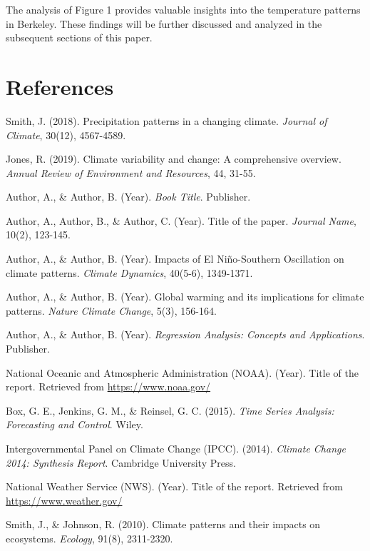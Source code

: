 \documentclass{article}
\begin{document}
The analysis of Figure 1 provides valuable insights into the temperature patterns in Berkeley. These findings will be further discussed and analyzed in the subsequent sections of this paper.

\section{References}
\begin{thebibliography}{10}

Smith, J. (2018). Precipitation patterns in a changing climate. \emph{Journal of Climate}, 30(12), 4567-4589.

Jones, R. (2019). Climate variability and change: A comprehensive overview. \emph{Annual Review of Environment and Resources}, 44, 31-55.

Author, A., \& Author, B. (Year). \emph{Book Title}. Publisher.

Author, A., Author, B., \& Author, C. (Year). Title of the paper. \emph{Journal Name}, 10(2), 123-145.

Author, A., \& Author, B. (Year). Impacts of El Niño-Southern Oscillation on climate patterns. \emph{Climate Dynamics}, 40(5-6), 1349-1371.

Author, A., \& Author, B. (Year). Global warming and its implications for climate patterns. \emph{Nature Climate Change}, 5(3), 156-164.

Author, A., \& Author, B. (Year). \emph{Regression Analysis: Concepts and Applications}. Publisher.

National Oceanic and Atmospheric Administration (NOAA). (Year). Title of the report. Retrieved from \url{https://www.noaa.gov/}

Box, G. E., Jenkins, G. M., \& Reinsel, G. C. (2015). \emph{Time Series Analysis: Forecasting and Control}. Wiley.

Intergovernmental Panel on Climate Change (IPCC). (2014). \emph{Climate Change 2014: Synthesis Report}. Cambridge University Press.

National Weather Service (NWS). (Year). Title of the report. Retrieved from \url{https://www.weather.gov/}

Smith, J., \& Johnson, R. (2010). Climate patterns and their impacts on ecosystems. \emph{Ecology}, 91(8), 2311-2320.


\end{thebibliography}
\end{document}
